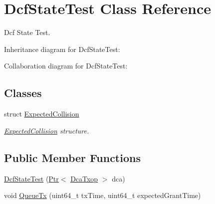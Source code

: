 \hypertarget{classDcfStateTest}{}\section{Dcf\+State\+Test Class Reference}
\label{classDcfStateTest}


Dcf State Test.  




Inheritance diagram for Dcf\+State\+Test\+:


Collaboration diagram for Dcf\+State\+Test\+:
\subsection*{Classes}
\begin{DoxyCompactItemize}
\item 
struct \hyperlink{structDcfStateTest_1_1ExpectedCollision}{Expected\+Collision}
\begin{DoxyCompactList}\small\item\em \hyperlink{structDcfStateTest_1_1ExpectedCollision}{Expected\+Collision} structure. \end{DoxyCompactList}\end{DoxyCompactItemize}
\subsection*{Public Member Functions}
\begin{DoxyCompactItemize}
\item 
\hyperlink{classDcfStateTest_ac53c5fd0c649559c1e9b7bbdc18da7f0}{Dcf\+State\+Test} (\hyperlink{classns3_1_1Ptr}{Ptr}$<$ \hyperlink{classns3_1_1DcaTxop}{Dca\+Txop} $>$ dca)
\item 
void \hyperlink{classDcfStateTest_ad737636a017eb5166bab22cceca6db77}{Queue\+Tx} (uint64\+\_\+t tx\+Time, uint64\+\_\+t expected\+Grant\+Time)
\end{DoxyCompactItemize}
